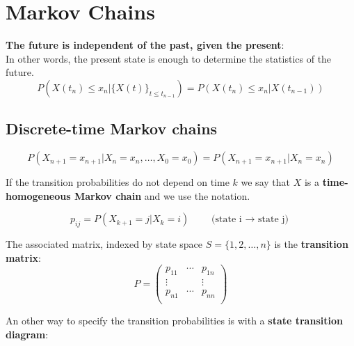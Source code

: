 \section{Markov Chains }
\textbf{The future is independent of the past, given the present}:\\
In other words, the present state is enough to determine the statistics of the future.
\begin{equation}
	P\left(X(t_n)\leq x_n|\{X(t)\}_{t\leq t_{n-1}}\right)=P\left(X(t_n)\leq x_n|X(t_{n-1})\right)\nonumber
\end{equation}

\subsection{Discrete-time Markov chains }
\begin{equation}
	P\left(X_{n+1}=x_{n+1}|X_n=x_n,\ldots,X_0=x_0\right)=P\left(X_{n+1}=x_{n+1}|X_n=x_n\right)\nonumber
\end{equation}

 If the transition probabilities do not depend on time $k$ we say that $X$ is a \textbf{time-homogeneous Markov chain} and we use the notation.

\begin{equation}
	p_{ij}=P(X_{k+1}=j|X_k=i) \qquad \text{(state i $\rightarrow$ state j)}\nonumber
\end{equation}

The associated matrix, indexed by state space $S=\{1,2,\ldots,n\}$ is the \textbf{transition matrix}:
\begin{equation}
	P=\begin{pmatrix}
		p_{11} &\cdots & p_{1n}\\
		\vdots& & 	\vdots\\
		p_{n1} &\cdots & p_{nn}\\
	\end{pmatrix}\nonumber
\end{equation}

An other way to specify the transition probabilities is with a \textbf{state transition diagram}:

